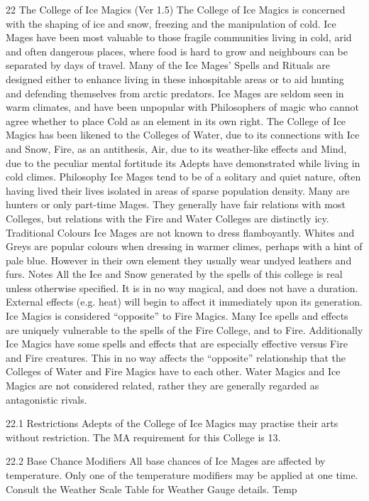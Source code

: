 \documentclass[a4paper]{article}
\begin{document}
\begin{multicols}{3}
22 The College of Ice Magics (Ver 1.5)
The College of Ice Magics is concerned with the
shaping of ice and snow, freezing and the manipulation of cold.
Ice Mages have been most valuable to those fragile
communities living in cold, arid and often dangerous places, where food is hard to grow and
neighbours can be separated by days of travel.
Many of the Ice Mages’ Spells and Rituals are
designed either to enhance living in these inhospitable areas or to aid hunting and defending themselves from arctic predators. Ice Mages are seldom
seen in warm climates, and have been unpopular
with Philosophers of magic who cannot agree
whether to place Cold as an element in its own
right. The College of Ice Magics has been likened
to the Colleges of Water, due to its connections
with Ice and Snow, Fire, as an antithesis, Air, due
to its weather-like effects and Mind, due to the
peculiar mental fortitude its Adepts have demonstrated while living in cold climes.
Philosophy
Ice Mages tend to be of a solitary and quiet nature,
often having lived their lives isolated in areas of
sparse population density. Many are hunters or
only part-time Mages. They generally have fair
relations with most Colleges, but relations with the
Fire and Water Colleges are distinctly icy.
Traditional Colours
Ice Mages are not known to dress flamboyantly.
Whites and Greys are popular colours when dressing in warmer climes, perhaps with a hint of pale
blue. However in their own element they usually
wear undyed leathers and furs.
Notes
All the Ice and Snow generated by the spells of this
college is real unless otherwise specified. It is in no
way magical, and does not have a duration. External effects (e.g. heat) will begin to affect it immediately upon its generation.
Ice Magics is considered “opposite” to Fire
Magics. Many Ice spells and effects are uniquely
vulnerable to the spells of the Fire College, and to
Fire. Additionally Ice Magics have some spells and
effects that are especially effective versus Fire and
Fire creatures. This in no way affects the “opposite” relationship that the Colleges of Water and
Fire Magics have to each other. Water Magics and
Ice Magics are not considered related, rather they
are generally regarded as antagonistic rivals.

22.1 Restrictions
Adepts of the College of Ice Magics may practise
their arts without restriction.
The MA requirement for this College is 13.

22.2 Base Chance Modifiers
All base chances of Ice Mages are affected by
temperature. Only one of the temperature modifiers
may be applied at one time. Consult the Weather
Scale Table for Weather Gauge details.
Temp


\end{multicols}
\end{document}
